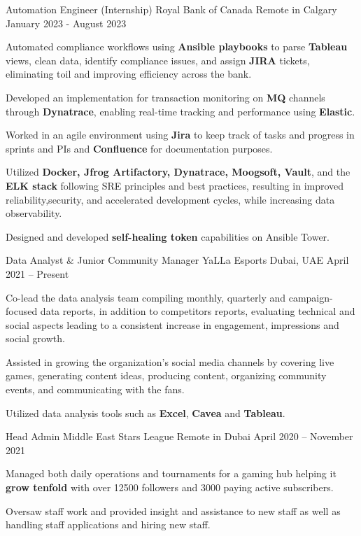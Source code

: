 \documentclass[]{awesome-cv}
\begin{document}
\vspace{-2mm}
\begin{cventries}
	\cventry
	{Automation Engineer (Internship)}
	{Royal Bank of Canada}
	{Remote in Calgary}
	{January 2023 - August 2023}
	{\begin{cvitems}
		\item {Automated compliance workflows using \textbf{Ansible playbooks} to parse \textbf{Tableau} views, clean data, identify compliance issues, and assign \textbf{JIRA} tickets, eliminating toil and improving efficiency across the bank.}
		\item {Developed an implementation for transaction monitoring on \textbf{MQ} channels through \textbf{Dynatrace}, enabling real-time tracking and performance using \textbf{Elastic}.}
		\item {Worked in an agile environment using \textbf{Jira} to keep track of tasks and progress in sprints and PIs and \textbf{Confluence} for documentation purposes.}
  		\item {Utilized \textbf{Docker, Jfrog Artifactory, Dynatrace, Moogsoft, Vault}, and the \textbf{ELK stack} following SRE principles and best practices, resulting in improved reliability,security, and accelerated development cycles, while increasing data observability.}
		\item {Designed and developed \textbf{self-healing token} capabilities on Ansible Tower.}
		\end{cvitems}}
		\vspace{1mm}
  
	\cventry
	{Data Analyst \& Junior Community Manager}
	{YaLLa Esports}
	{Dubai, UAE}
	{April 2021 – Present}
	{\begin{cvitems}
		\item {Co-lead the data analysis team compiling monthly, quarterly and campaign-focused data reports, in addition to competitors reports, evaluating technical and social aspects leading to a consistent increase in engagement, impressions and social growth.}
		\item {Assisted in growing the organization's social media channels by covering live games, generating content ideas, producing content, organizing community events, and communicating with the fans.}
  		\item {Utilized data analysis tools such as \textbf{Excel}, \textbf{Cavea} and \textbf{Tableau}.}
		\end{cvitems}}
		\vspace{1mm}
	\cventry
	{Head Admin}
	{Middle East Stars League}
	{Remote in Dubai}
	{April 2020 – November 2021}
	{\begin{cvitems}
		\item {Managed both daily operations and tournaments for a gaming hub helping it \textbf{grow tenfold} with over 12500 followers and 3000 paying active subscribers.}
		\item {Oversaw staff work and provided insight and assistance to new staff as well as handling staff applications and hiring new staff.}
		\end{cvitems}}


\end{cventries}
\end{document}

